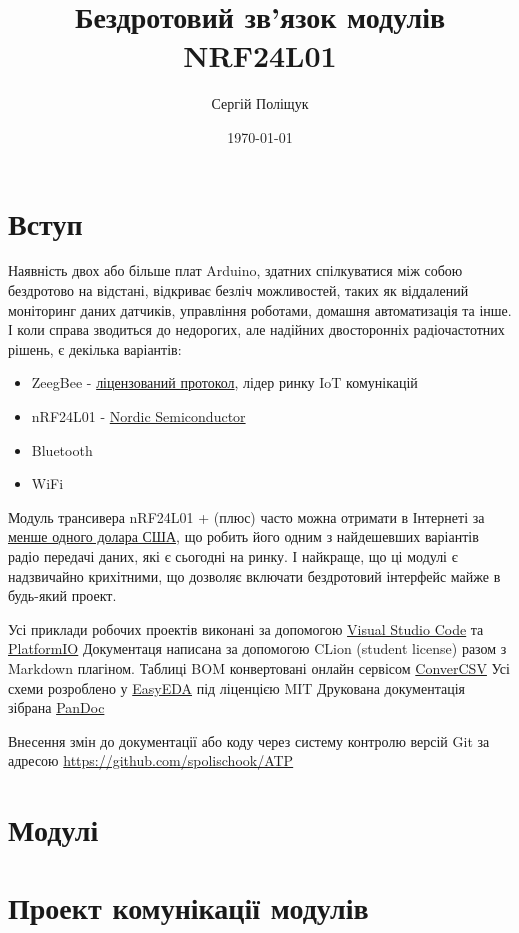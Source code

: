 \documentclass[14pt,a4paper]{extarticle}
\title{Бездротовий зв'язок модулів NRF24L01}
\author{Сергій Поліщук}
\date{\today}
\begin{document}
\maketitle
\tableofcontents
\clearpage
\section{Вступ}
Наявність двох або більше плат Arduino, здатних спілкуватися між собою
бездротово на відстані, відкриває безліч можливостей, таких як
віддалений моніторинг даних датчиків, управління роботами, домашня
автоматизація та інше. І коли справа зводиться до недорогих, але
надійних двосторонніх радіочастотних рішень, є декілька варіантів:
\begin{itemize}
\item ZeegBee -
\href{https://web.archive.org/web/20100216234546/http://freaklabs.org/index.php/Blog/Zigbee/Zigbee-Linux-and-the-GPL.html}{ліцензований
протокол}, лідер ринку IoT комунікацій
\item nRF24L01 -
\href{https://www.nordicsemi.com/Products/Low-power-short-range-wireless/nRF24-series}{Nordic
Semiconductor}
\item Bluetooth
\item WiFi
\end{itemize}

Модуль трансивера nRF24L01 + (плюс) часто можна отримати в Інтернеті за
\href{https://ru.aliexpress.com/wholesale?SearchText=nrf24l01}{менше
одного долара США}, що робить його одним з найдешевших варіантів радіо
передачі даних, які є сьогодні на ринку. І найкраще, що ці модулі є
надзвичайно крихітними, що дозволяє включати бездротовий інтерфейс майже
в будь-який проект.

Усі приклади робочих проектів виконані за допомогою
\href{https://code.visualstudio.com/}{Visual Studio Code}
та \href{https://platformio.org/}{PlatformIO}  
Документаця написана за допомогою CLion (student license)
разом з Markdown плагіном.  
Таблиці BOM конвертовані онлайн сервісом \href{https://www.convertcsv.com/csv-to-markdown.htm}{ConverCSV}  
Усі схеми розроблено у \href{https://easyeda.com/}{EasyEDA} під ліценцією MIT  
Друкована документація зібрана \href{https://pandoc.org/}{PanDoc}

Внесення змін до документації або коду через систему контролю
версій Git за адресою
\href{https://github.com/spolischook/ATP}{https://github.com/spolischook/ATP}


\clearpage


\clearpage
\section{Модулі}


\clearpage

\clearpage

\clearpage

\clearpage
\section{Проект комунікації модулів}
\end{document}
